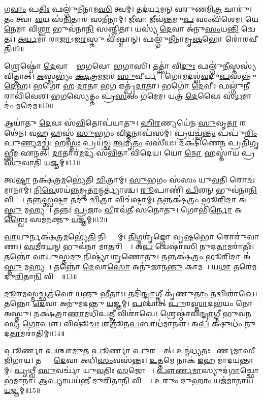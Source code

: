 𑌗\ul{𑌵𑌾𑌂} 𑌪\ul{𑌤𑌿𑌃} 𑌫𑌲𑍍𑌗𑍁॑𑌨𑍀𑌨𑌾𑌮\ul{𑌸𑌿} 𑌤𑍍𑌵𑌮𑍍। 
𑌤𑌦॑𑌰𑍍𑌯𑌮𑌨𑍍 𑌵𑌰𑍁𑌣𑌮𑌿\ul{𑌤𑍍𑌰} 𑌚𑌾𑌰𑍁॑। 
𑌤𑌂 𑌤𑍍𑌵𑌾॑ \ul{𑌵}𑌯 𑌸॑\ul{𑌨𑌿}𑌤𑌾𑌰॑ 𑌸\ul{𑌨𑍀}𑌨𑌾𑌮𑍍। 
\ul{𑌜𑍀}𑌵𑌾 𑌜𑍀𑌵॑\ul{𑌨𑍍𑌤}𑌮𑍁\ul{𑌪} 𑌸𑌂𑌵𑌿॑𑌶𑍇𑌮। 
𑌯𑍇\ul{𑌨𑍇}𑌮𑌾 𑌵𑌿\ul{𑌶𑍍𑌵𑌾} 𑌭𑍁𑌵॑𑌨𑌾\ul{𑌨𑌿} 𑌸𑌞𑍍𑌜𑌿॑𑌤𑌾। 
𑌯𑌸𑍍𑌯॑ \ul{𑌦𑍇}𑌵𑌾 𑌅॑𑌨𑍁\ul{𑌸𑌂}𑌯\ul{𑌨𑍍𑌤𑌿} 𑌚𑍇𑌤𑌃॑। 
\ul{𑌅}\ul{𑌰𑍍𑌯}𑌮𑌾 𑌰𑌾\ul{𑌜𑌾}𑌽𑌜\ul{𑌰}𑌸𑍍𑌤𑍁 𑌵𑌿॑𑌷𑍍𑌮𑌾𑌨𑍍। 
𑌫𑌲𑍍𑌗𑍁॑𑌨𑍀𑌨𑌾𑌮𑍃\ul{𑌷}𑌭𑍋 𑌰𑍋॑𑌰𑌵𑍀𑌤𑌿॥9॥ 

𑌶𑍍𑌰𑍇𑌷𑍍𑌠𑍋॑ \ul{𑌦𑍇}𑌵𑌾𑌨𑌾𑌂᳚ 𑌭𑌗𑌵𑍋 𑌭𑌗𑌾𑌸𑌿। 
𑌤𑌤𑍍𑌤𑍍𑌵𑌾॑ 𑌵𑌿\ul{𑌦𑍁𑌃} 𑌫𑌲𑍍𑌗𑍁॑\ul{𑌨𑍀}𑌸𑍍𑌤𑌸𑍍𑌯॑ 𑌵𑌿𑌤𑍍𑌤𑌾𑌤𑍍। 
\ul{𑌅}𑌸𑍍𑌮𑌭𑍍𑌯𑌂॑ \ul{𑌕𑍍𑌷}𑌤𑍍𑌰\ul{𑌮}𑌜𑌰॑ \ul{𑌸𑍁}𑌵𑍀𑌰𑍍𑌯𑌮𑍍᳚। 
𑌗𑍋\ul{𑌮}𑌦𑌶𑍍𑌵॑\ul{𑌵}𑌦𑍁\ul{𑌪}𑌸𑌨𑍍𑌨𑍁॑\-\ul{𑌦𑍇}𑌹। 
𑌭𑌗𑍋॑ 𑌹 \ul{𑌦𑌾}𑌤𑌾 𑌭\ul{𑌗} 𑌇𑌤𑍍𑌪𑍍𑌰॑\ul{𑌦𑌾}𑌤𑌾। 
𑌭𑌗𑍋॑ \ul{𑌦𑍇}𑌵𑍀𑌃 𑌫𑌲𑍍𑌗𑍁॑\ul{𑌨𑍀}𑌰𑌾𑌵𑌿॑𑌵𑍇𑌶। 
𑌭\ul{𑌗}𑌸𑍍𑌯𑍇𑌤𑍍𑌤𑌂 𑌪𑍍𑌰॑\ul{𑌸}𑌵𑌂 𑌗॑𑌮𑍇𑌮। 
𑌯𑌤𑍍𑌰॑ \ul{𑌦𑍇}𑌵𑍈𑌃 𑌸॑\ul{𑌧}𑌮𑌾𑌦𑌂॑ 𑌮𑌦𑍇𑌮॥10॥ 

𑌆𑌯𑌾॑𑌤𑍁 \ul{𑌦𑍇}𑌵𑌃 𑌸॑\ul{𑌵𑌿}𑌤𑍋𑌪॑𑌯𑌾𑌤𑍁। 
\ul{𑌹𑌿}\ul{𑌰}𑌣𑍍𑌯𑌯𑍇॑𑌨 \ul{𑌸𑍁}𑌵𑍃\ul{𑌤𑌾} 𑌰𑌥𑍇॑𑌨। 
𑌵\ul{𑌹}\an{} 𑌹𑌸𑍍𑌤॑ \ul{𑌸𑍁}𑌭𑌗𑌂॑ 𑌵𑌿\ul{𑌦𑍍𑌮}𑌨𑌾𑌪॑𑌸𑌮𑍍। 
𑌪𑍍𑌰𑌯𑌚𑍍𑌛॑\ul{𑌨𑍍𑌤𑌂} 𑌪𑌪𑍁॑\ul{𑌰𑌿𑌂} 𑌪𑍁\ul{𑌣𑍍𑌯}𑌮𑌚𑍍𑌛॑। 
𑌹\ul{𑌸𑍍𑌤𑌃} 𑌪𑍍𑌰𑌯॑𑌚𑍍𑌛 \ul{𑌤𑍍𑌵}𑌮𑍃\ul{𑌤𑌂} 𑌵𑌸𑍀॑𑌯𑌃। 
𑌦𑌕𑍍𑌷𑌿॑𑌣𑍇\ul{𑌨} 𑌪𑍍𑌰𑌤𑌿॑𑌗𑍃𑌭𑍍𑌣𑍀𑌮 𑌏𑌨𑌤𑍍। 
\ul{𑌦𑌾}𑌤𑌾𑌰॑\ul{𑌮}𑌦𑍍𑌯 𑌸॑\ul{𑌵𑌿}𑌤𑌾 𑌵𑌿॑𑌦𑍇𑌯। 
𑌯𑍋 \ul{𑌨𑍋} 𑌹𑌸𑍍𑌤𑌾॑𑌯 𑌪𑍍𑌰\ul{𑌸𑍁}𑌵𑌾𑌤𑌿॑ \ul{𑌯}𑌜𑍍𑌞𑌮𑍍॥11॥ 

𑌤𑍍𑌵\ul{𑌷𑍍𑌟𑌾} 𑌨𑌕𑍍𑌷॑𑌤𑍍𑌰\ul{𑌮}𑌭𑍍𑌯𑍇॑𑌤𑌿 \ul{𑌚𑌿}𑌤𑍍𑌰𑌾𑌮𑍍। 
\ul{𑌸𑍁}𑌭𑌗𑌂 𑌸॑𑌸𑌂 𑌯𑍁\ul{𑌵}𑌤𑌿 𑌰𑍋𑌚॑𑌮𑌾𑌨𑌾𑌮𑍍। 
\ul{𑌨𑌿}\ul{𑌵𑍇}𑌶𑌯॑\ul{𑌨𑍍𑌨}\-𑌮𑍃\ul{𑌤𑌾}𑌨𑍍𑌮𑌰𑍍𑌤𑍍𑌯𑌾॑𑌶𑍍𑌚। 
\ul{𑌰𑍂}𑌪𑌾𑌣𑌿॑ \ul{𑌪𑌿}\ul{}𑌶𑌨𑍍 𑌭𑍁𑌵॑𑌨𑌾\ul{𑌨𑌿} 𑌵𑌿𑌶𑍍𑌵𑌾᳚। 
𑌤\ul{𑌨𑍍𑌨}𑌸𑍍𑌤𑍍𑌵\ul{𑌷𑍍𑌟𑌾} 𑌤𑌦𑍁॑ \ul{𑌚𑌿}𑌤𑍍𑌰𑌾 𑌵𑌿𑌚॑𑌷𑍍𑌟𑌾𑌮𑍍। 
𑌤𑌨𑍍𑌨𑌕𑍍𑌷॑𑌤𑍍𑌰𑌂 𑌭𑍂\ul{𑌰𑌿}𑌦𑌾 𑌅॑\ul{𑌸𑍍𑌤𑍁} 𑌮𑌹𑍍𑌯𑌮𑍍᳚। 
𑌤𑌨𑍍𑌨𑌃॑ \ul{𑌪𑍍𑌰}𑌜𑌾𑌂 \ul{𑌵𑍀}𑌰𑌵॑𑌤𑍀 𑌸𑌨𑍋𑌤𑍁। 
𑌗𑍋𑌭𑌿॑\ul{𑌰𑍍𑌨𑍋} 𑌅\ul{𑌶𑍍𑌵𑍈𑌃} 𑌸𑌮॑𑌨𑌕𑍍𑌤𑍁 \ul{𑌯}𑌜𑍍𑌞𑌮𑍍॥12॥ 

\ul{𑌵𑌾}𑌯𑍁𑌰𑍍𑌨𑌕𑍍𑌷॑𑌤𑍍𑌰\ul{𑌮}𑌭𑍍𑌯𑍇॑\ul{𑌤𑌿} 𑌨𑌿𑌷𑍍𑌟𑍍𑌯𑌾᳚𑌮𑍍। 
\ul{𑌤𑌿}𑌗𑍍𑌮𑌶𑍃॑𑌙𑍍𑌗𑍋 𑌵𑍃\ul{𑌷}𑌭𑍋 𑌰𑍋𑌰𑍁॑𑌵𑌾𑌣𑌃। 
\ul{𑌸}\ul{𑌮𑍀}𑌰\ul{𑌯}𑌨𑍍 𑌭𑍁𑌵॑𑌨𑌾 𑌮𑌾\ul{𑌤}𑌰𑌿𑌶𑍍𑌵𑌾᳚। 
𑌅\ul{𑌪} 𑌦𑍍𑌵𑍇𑌷𑌾॑𑌸𑌿 𑌨𑍁𑌦\ul{𑌤𑌾}𑌮𑌰𑌾॑𑌤𑍀𑌃। 
𑌤𑌨𑍍𑌨𑍋॑ \ul{𑌵𑌾}𑌯𑍁𑌸𑍍𑌤\ul{𑌦𑍁} 𑌨𑌿𑌷𑍍𑌟𑍍𑌯𑌾॑ 𑌶𑍃𑌣𑍋𑌤𑍁। 
𑌤𑌨𑍍𑌨𑌕𑍍𑌷॑𑌤𑍍𑌰𑌂 𑌭𑍂\ul{𑌰𑌿}𑌦𑌾 𑌅॑\ul{𑌸𑍍𑌤𑍁} 𑌮𑌹𑍍𑌯𑌮𑍍᳚। 
𑌤𑌨𑍍𑌨𑍋॑ \ul{𑌦𑍇}𑌵𑌾\ul{𑌸𑍋} 𑌅𑌨𑍁॑𑌜𑌾𑌨\ul{𑌨𑍍𑌤𑍁} 𑌕𑌾𑌮𑌮𑍍᳚। 
𑌯\ul{𑌥𑌾} 𑌤𑌰𑍇॑𑌮 𑌦𑍁\ul{𑌰𑌿}𑌤𑌾\ul{𑌨𑌿} 𑌵𑌿𑌶𑍍𑌵𑌾᳚॥13॥ 

\ul{𑌦𑍂}𑌰\ul{𑌮}𑌸𑍍𑌮𑌚𑍍𑌛𑌤𑍍𑌰॑𑌵𑍋 𑌯𑌨𑍍𑌤𑍁 \ul{𑌭𑍀}𑌤𑌾𑌃। 
𑌤𑌦𑌿॑\ul{𑌨𑍍𑌦𑍍𑌰𑌾}𑌗𑍍𑌨𑍀 𑌕𑍃॑𑌣𑍁\ul{𑌤𑌾𑌂} 𑌤𑌦𑍍𑌵𑌿𑌶𑌾॑𑌖𑍇। 
𑌤𑌨𑍍𑌨𑍋॑ \ul{𑌦𑍇}𑌵𑌾 𑌅𑌨𑍁॑𑌮𑌦𑌨𑍍𑌤𑍁 \ul{𑌯}𑌜𑍍𑌞𑌮𑍍। 
\ul{𑌪}𑌶𑍍𑌚𑌾𑌤𑍍 \ul{𑌪𑍁}𑌰\ul{𑌸𑍍𑌤𑌾}𑌦𑌭॑𑌯𑌂 𑌨𑍋 𑌅𑌸𑍍𑌤𑍁। 
𑌨𑌕𑍍𑌷॑𑌤𑍍𑌰𑌾\ul{𑌣𑌾}𑌮𑌧𑌿॑𑌪\ul{𑌤𑍍𑌨𑍀} 𑌵𑌿𑌶𑌾॑𑌖𑍇। 
𑌶𑍍𑌰𑍇𑌷𑍍𑌠𑌾॑𑌵𑌿\ul{𑌨𑍍𑌦𑍍𑌰𑌾}𑌗𑍍𑌨𑍀 𑌭𑍁𑌵॑𑌨𑌸𑍍𑌯 \ul{𑌗𑍋}𑌪𑍗। 
𑌵𑌿𑌷𑍂॑\ul{𑌚𑌃} 𑌶𑌤𑍍𑌰𑍂॑𑌨\ul{𑌪}𑌬𑌾𑌧॑𑌮𑌾𑌨𑍗। 
𑌅\ul{𑌪} 𑌕𑍍𑌷𑍁𑌧𑌂॑ 𑌨𑍁𑌦\ul{𑌤𑌾}𑌮𑌰𑌾॑𑌤𑌿𑌮𑍍॥14॥ 

\ul{𑌪𑍂}𑌰𑍍𑌣𑌾 \ul{𑌪}𑌶𑍍𑌚𑌾\ul{𑌦𑍁}𑌤 \ul{𑌪𑍂}𑌰𑍍𑌣𑌾 \ul{𑌪𑍁}𑌰𑌸𑍍𑌤𑌾᳚𑌤𑍍। 
𑌉𑌨𑍍𑌮॑\ul{𑌧𑍍𑌯}𑌤𑌃 𑌪𑍗᳚𑌰𑍍𑌣\ul{𑌮𑌾}𑌸𑍀 𑌜𑌿॑𑌗𑌾𑌯। 
𑌤𑌸𑍍𑌯𑌾𑌂᳚ \ul{𑌦𑍇}𑌵𑌾 𑌅𑌧𑌿॑\ul{𑌸𑌂}𑌵𑌸॑𑌨𑍍𑌤𑌃। 
\ul{𑌉}\ul{𑌤𑍍𑌤}𑌮𑍇 𑌨𑌾𑌕॑ \ul{𑌇}𑌹 𑌮𑌾॑𑌦𑌯𑌨𑍍𑌤𑌾𑌮𑍍। 
\ul{𑌪𑍃}𑌥𑍍𑌵𑍀 \ul{𑌸𑍁}𑌵𑌰𑍍𑌚𑌾॑ 𑌯𑍁\ul{𑌵}𑌤𑌿𑌃 \ul{𑌸}𑌜𑍋𑌷𑌾𑌃᳚। 
\ul{𑌪𑍗}\ul{𑌰𑍍𑌣}\ul{𑌮𑌾}𑌸𑍍𑌯𑍁𑌦॑\ul{𑌗𑌾}𑌚𑍍𑌛𑍋𑌭॑𑌮𑌾𑌨𑌾। 
\ul{𑌆}\ul{𑌪𑍍𑌯𑌾}𑌯𑌯॑𑌨𑍍𑌤𑍀 𑌦𑍁\ul{𑌰𑌿}𑌤𑌾\ul{𑌨𑌿} 𑌵𑌿𑌶𑍍𑌵𑌾᳚। 
\ul{𑌉}𑌰𑍁𑌂 𑌦𑍁\ul{𑌹𑌾𑌂} 𑌯𑌜॑𑌮𑌾𑌨𑌾𑌯 \ul{𑌯}𑌜𑍍𑌞𑌮𑍍॥15॥ 

